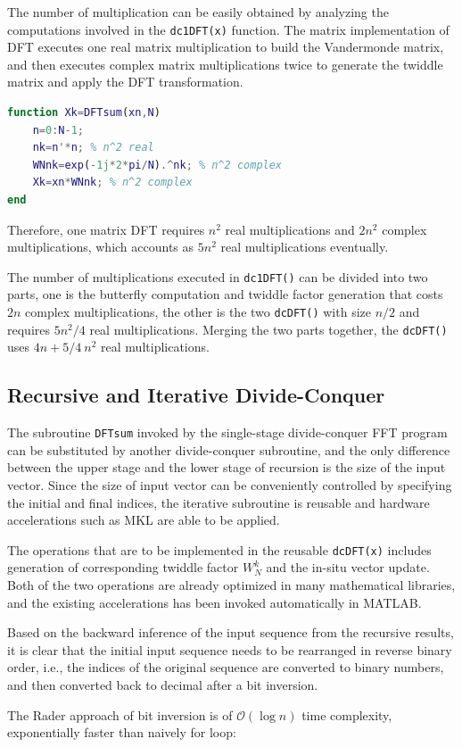 \documentclass[conference]{IEEEtran}
\begin{document}
The number of multiplication can be easily obtained by analyzing the computations involved in the \lstinline{dc1DFT(x)} function. The matrix implementation of DFT executes one real matrix multiplication to build the Vandermonde matrix, and then executes complex matrix multiplications twice to generate the twiddle matrix and apply the DFT transformation.

\begin{lstlisting}[language=matlab, style=matlab]
function Xk=DFTsum(xn,N)
	n=0:N-1;
	nk=n'*n; % n^2 real
	WNnk=exp(-1j*2*pi/N).^nk; % n^2 complex
	Xk=xn*WNnk; % n^2 complex
end
\end{lstlisting}

Therefore, one matrix DFT requires \( n^2 \) real multiplications and \( 2n^2 \) complex multiplications, which accounts as \( 5n^2 \) real multiplications eventually.

The number of multiplications executed in \lstinline{dc1DFT()} can be divided into two parts, one is the butterfly computation and twiddle factor generation that costs \( 2n \) complex multiplications, the other is the two \lstinline{dcDFT()} with size \( n/2 \) and requires \( 5n^{2}/4 \) real multiplications. Merging the two parts together, the \lstinline{dcDFT()} uses \( 4n+5/4\ n^{2} \) real multiplications.

\subsection{Recursive and Iterative Divide-Conquer}

The subroutine \lstinline{DFTsum} invoked by the single-stage divide-conquer FFT program can be substituted by another divide-conquer subroutine, and the only difference between the upper stage and the lower stage of recursion is the size of the input vector. Since the size of input vector can be conveniently controlled by specifying the initial and final indices, the iterative subroutine is reusable and hardware accelerations such as MKL are able to be applied.

The operations that are to be implemented in the reusable \lstinline{dcDFT(x)} includes generation of corresponding twiddle factor \( W_{N}^{k} \) and the in-situ vector update. Both of the two operations are already optimized in many mathematical libraries, and the existing accelerations has been invoked automatically in MATLAB.

Based on the backward inference of the input sequence from the recursive results, it is clear that the initial input sequence needs to be rearranged in reverse binary order, i.e., the indices of the original sequence are converted to binary numbers, and then converted back to decimal after a bit inversion.



The Rader approach of bit inversion is of \( \mathcal{O} (\log n) \) time complexity, exponentially faster than naively for loop:


\end{document}
